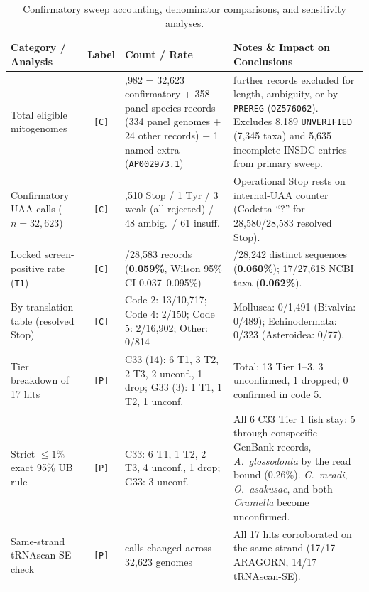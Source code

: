 \documentclass[11pt, a4paper]{article}
\begin{document}
\vspace{0.8em}

\begin{table}[htbp]
\centering
\footnotesize
\setlength{\tabcolsep}{4pt}
\renewcommand{\arraystretch}{1.2}
\caption{Confirmatory sweep accounting, denominator comparisons, and sensitivity analyses.}\label{tab:summary}
\begin{tabularx}{\textwidth}{
  >{\raggedright\arraybackslash}p{4.0cm}
  c
  >{\raggedright\arraybackslash}p{4.3cm}
  >{\raggedright\arraybackslash}X
}
\toprule
\textbf{Category / Analysis} & \textbf{Label} & \textbf{Count / Rate} & \textbf{Notes \& Impact on Conclusions} \\
\midrule
Total eligible mitogenomes & \texttt{[C]} & 32,982 = 32,623 confirmatory + 358 panel-species records (334 panel genomes + 24 other records) + 1 named extra (\texttt{AP002973.1}) & 98 further records excluded for length, ambiguity, or by \texttt{PREREG} (\texttt{OZ576062}). Excludes 8,189 \texttt{UNVERIFIED} (7,345 taxa) and 5,635 incomplete INSDC entries from primary sweep. \\
Confirmatory UAA calls ($n = 32,623$) & \texttt{[C]} & 32,510 Stop / 1 Tyr / 3 weak (all rejected) / 48 ambig.\ / 61 insuff. & Operational Stop rests on internal-UAA counter (Codetta ``?'' for 28,580/28,583 resolved Stop). \\
Locked screen-positive rate (\texttt{T1}) & \texttt{[C]} & 17/28,583 records (\textbf{0.059\%}, Wilson 95\% CI 0.037--0.095\%) & 17/28,242 distinct sequences (\textbf{0.060\%}); 17/27,618 NCBI taxa (\textbf{0.062\%}). \\
By translation table (resolved Stop) & \texttt{[C]} & Code 2: 13/10,717; Code 4: 2/150; Code 5: 2/16,902; Other: 0/814 & Mollusca: 0/1,491 (Bivalvia: 0/489); Echinodermata: 0/323 (Asteroidea: 0/77). \\
Tier breakdown of 17 hits & \texttt{[P]} & C33 (14): 6 T1, 3 T2, 2 T3, 2 unconf., 1 drop; G33 (3): 1 T1, 1 T2, 1 unconf. & Total: 13 Tier 1--3, 3 unconfirmed, 1 dropped; 0 confirmed in code 5. \\
Strict $\le 1\%$ exact 95\% UB rule & \texttt{[P]} & C33: 6 T1, 1 T2, 2 T3, 4 unconf., 1 drop; G33: 3 unconf. & All 6 C33 Tier 1 fish stay: 5 through conspecific GenBank records, \textit{A.\ glossodonta} by the read bound (0.26\%). \textit{C.\ meadi}, \textit{O.\ asakusae}, and both \textit{Craniella} become unconfirmed. \\
Same-strand tRNAscan-SE check & \texttt{[P]} & 0 calls changed across 32,623 genomes & All 17 hits corroborated on the same strand (17/17 ARAGORN, 14/17 tRNAscan-SE). \\

\end{tabularx}
\end{table}
\end{document}
